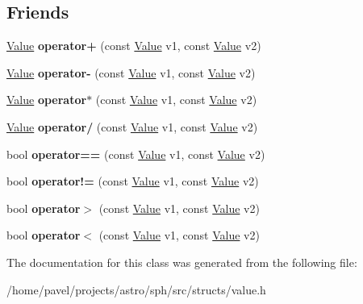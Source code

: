 \subsection*{Friends}
\begin{DoxyCompactItemize}
\item 
\hypertarget{classValue_a3a359b28ee4d7d6336ce1ae3ade5d773}{}\label{classValue_a3a359b28ee4d7d6336ce1ae3ade5d773} 
\hyperlink{classValue}{Value} {\bfseries operator+} (const \hyperlink{classValue}{Value} v1, const \hyperlink{classValue}{Value} v2)
\item 
\hypertarget{classValue_a515f2c6fa6a5f83fc0d7d1b17b742867}{}\label{classValue_a515f2c6fa6a5f83fc0d7d1b17b742867} 
\hyperlink{classValue}{Value} {\bfseries operator-\/} (const \hyperlink{classValue}{Value} v1, const \hyperlink{classValue}{Value} v2)
\item 
\hypertarget{classValue_a6238c10385fa172c9dd765e81b0ad4c3}{}\label{classValue_a6238c10385fa172c9dd765e81b0ad4c3} 
\hyperlink{classValue}{Value} {\bfseries operator$\ast$} (const \hyperlink{classValue}{Value} v1, const \hyperlink{classValue}{Value} v2)
\item 
\hypertarget{classValue_a6cd6468c96ac543e3e142885c5157f72}{}\label{classValue_a6cd6468c96ac543e3e142885c5157f72} 
\hyperlink{classValue}{Value} {\bfseries operator/} (const \hyperlink{classValue}{Value} v1, const \hyperlink{classValue}{Value} v2)
\item 
\hypertarget{classValue_a55cbb169e9cba9c91253c90e67ca7bb1}{}\label{classValue_a55cbb169e9cba9c91253c90e67ca7bb1} 
bool {\bfseries operator==} (const \hyperlink{classValue}{Value} v1, const \hyperlink{classValue}{Value} v2)
\item 
\hypertarget{classValue_a6245aaf99e6f952c68e6887ab3116737}{}\label{classValue_a6245aaf99e6f952c68e6887ab3116737} 
bool {\bfseries operator!=} (const \hyperlink{classValue}{Value} v1, const \hyperlink{classValue}{Value} v2)
\item 
\hypertarget{classValue_aaa4e421d27f35859cd9dc05f7294e40c}{}\label{classValue_aaa4e421d27f35859cd9dc05f7294e40c} 
bool {\bfseries operator$>$} (const \hyperlink{classValue}{Value} v1, const \hyperlink{classValue}{Value} v2)
\item 
\hypertarget{classValue_a39844c4b636d081cbeffb489196de27d}{}\label{classValue_a39844c4b636d081cbeffb489196de27d} 
bool {\bfseries operator$<$} (const \hyperlink{classValue}{Value} v1, const \hyperlink{classValue}{Value} v2)
\end{DoxyCompactItemize}


The documentation for this class was generated from the following file\+:\begin{DoxyCompactItemize}
\item 
/home/pavel/projects/astro/sph/src/structs/value.\+h\end{DoxyCompactItemize}
